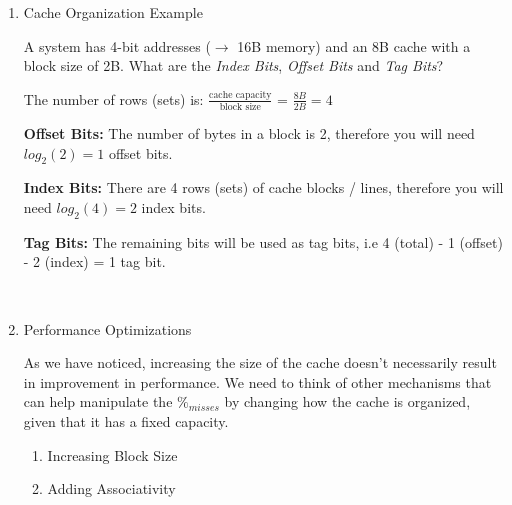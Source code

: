 \documentclass[12pt]{article}
\newenvironment{QandA}{\begin{enumerate}[label=\bfseries\arabic*.]\bfseries}
                      {\end{enumerate}}
\newenvironment{answered}{\par\quad\normalfont}{}
\begin{document}
\begin{QandA}
\begin{answered}
If you have a simple pipeline with $CPI_{base}=1$ and 30\% of instructions are LDR and STR. If the L1 cache has $\%_{miss}=2\%$ for the Instruction Cache (I\$) and $\%_{miss}=10\%$ for the Data Cache (D\$) with a miss penalty of $t_{miss}=10$ cycles for both, what is the new $CPI_{new}$?

\begin{equation*}
    CPI_{new} = CPI_{base} + \%_{I-miss} \times t_{I-miss} + \%_{D-miss} \times t_{D-miss}
\end{equation*}
\begin{equation*}
    CPI_{new} = 1.0 + 0.02 \times 10 + 0.1 \times 10 = 1 + 0.2 + 0.3 = 1.5
\end{equation*}
\end{answered}

\item Cache Organization Example
\begin{answered}
A system has 4-bit addresses ($\rightarrow$ 16B memory) and an 8B cache with a block size of 2B. What are the \textit{Index Bits}, \textit{Offset Bits} and \textit{Tag Bits}? 

The number of rows (sets) is: $\frac{\text{cache capacity}}{\text{block size}}$ = $\frac{8B}{2B} = 4$

\textbf{Offset Bits:} The number of bytes in a block is 2, therefore you will need $log_{2}(2)=1$ offset bits.

\textbf{Index Bits:} There are 4 rows (sets) of cache blocks / lines, therefore you will need $log_{2}(4)=2$ index bits.

\textbf{Tag Bits:} The remaining bits will be used as tag bits, i.e 4 (total) - 1 (offset) - 2 (index) = 1 tag bit. 
\end{answered}

\ 

\item Performance Optimizations
\begin{answered}
As we have noticed, increasing the size of the cache doesn't necessarily result in improvement in performance. We need to think of other mechanisms that can help manipulate the $\%_{misses}$ by changing how the cache is organized, given that it has a fixed capacity.

\begin{enumerate}
    \item Increasing Block Size
    \item Adding Associativity
\end{enumerate}
\end{answered}


\end{QandA}
\end{document}
